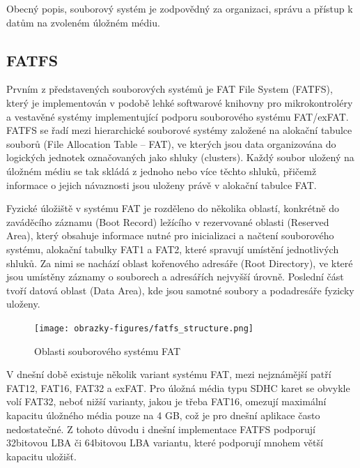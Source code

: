 Obecný popis, souborový systém je zodpovědný za organizaci, správu a přístup k datům na zvoleném úložném médiu.

\subsection{FATFS}
Prvním z představených souborových systémů je FAT File System (FATFS), který je implementován v podobě lehké softwarové knihovny pro mikrokontroléry a vestavěné systémy implementující podporu souborového systému FAT/exFAT. FATFS se řadí mezi hierarchické souborové systémy založené na alokační tabulce souborů (File Allocation Table – FAT), ve kterých jsou data organizována do logických jednotek označovaných jako shluky (clusters). Každý soubor uložený na úložném médiu se tak skládá z jednoho nebo více těchto shluků, přičemž informace o jejich návaznosti jsou uloženy právě v alokační tabulce FAT. \cite{recoverit_fat_filesystem, elm_fat_filesystem_docs}


Fyzické úložiště v systému FAT je rozděleno do několika oblastí, konkrétně do zaváděcího záznamu (Boot Record) ležícího v rezervované oblasti (Reserved Area), který obsahuje informace nutné pro inicializaci a načtení souborového systému, alokační tabulky FAT1 a FAT2, které spravují umístění jednotlivých shluků.  Za nimi se nachází oblast kořenového adresáře (Root Directory), ve které jsou umístěny záznamy o souborech a adresářích nejvyšší úrovně. Poslední část tvoří datová oblast (Data Area), kde jsou samotné soubory a podadresáře fyzicky uloženy.

\begin{figure}[h]
    \centering
    \texttt{[image: obrazky-figures/fatfs\_structure.png]}
    
    \caption{Oblasti souborového systému FAT \cite{recoverit_fat_filesystem}}
    \label{fig:fatfs-structure}
\end{figure}

V dnešní době existuje několik variant systému FAT, mezi nejznámější patří FAT12, FAT16, FAT32 a exFAT. Pro úložná média typu SDHC karet se obvykle volí FAT32, neboť nižší varianty, jakou je třeba FAT16, omezují maximální kapacitu úložného média pouze na 4 GB, což je pro dnešní aplikace často nedostatečné. Z tohoto důvodu i dnešní implementace FATFS podporují 32bitovou LBA či 64bitovou LBA variantu, které podporují mnohem větší kapacitu uložišť. \cite{elm_fat_filesystem_app_note}

